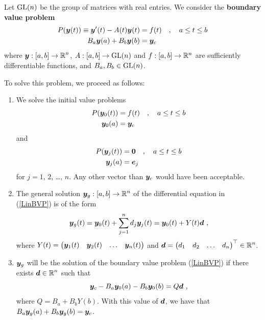 Let $\mathrm{GL}(n)$ be the group of \nn matrices with real entries.
We consider the
{\bfseries boundary value problem}
\begin{equation} \label{LinBVP}
\begin{split}
P(\bm{y}(t)) \equiv \bm{y}'(t) - A(t) \bm{y}(t) &= f(t)
\quad , \quad a \leq t \leq b  \\
B_a\bm{y}(a) + B_b\bm{y}(b) &= \bm{y}_c
\end{split}
\end{equation}
where $\displaystyle \bm{y} : [a,b] \rightarrow \mathbb{R}^n$,
$\displaystyle A:[a,b] \rightarrow \mathrm{GL}(n)$ and $f:[a,b]\rightarrow \mathbb{R}^n$
are sufficiently differentiable functions, and
$B_a, B_b \in \mathrm{GL}(n)$.

To solve this problem, we proceed as follows:

\begin{algo} \label{AlgoSimpleSM}
\begin{enumerate}
\item We solve the initial value problems
\begin{equation} \label{partS}
\begin{split}
P(\bm{y}_0(t)) &= f(t) \quad , \quad a \leq t \leq b \\
\bm{y}_0(a) &= \bm{y}_c
\end{split}
\end{equation}
and
\begin{equation} \label{genS}
\begin{split}
P(\bm{y}_j(t)) &= \bm{0} \quad , \quad a \leq t \leq b \\
\bm{y}_j(a) &= \bm{e}_j
\end{split}
\end{equation}
for $j=1$, $2$, \ldots, $n$.  Any other vector than $\bm{y}_c$ would
have been acceptable.
\item The general solution $\displaystyle \bm{y}_g:[a,b]\to \mathbb{R}^n$ of the
differential equation in (\ref{LinBVP}) is of the form
\[
\bm{y}_g(t) = \bm{y}_0(t) + \sum_{j=1}^n d_j \bm{y}_j(t) =
\bm{y}_0(t) + Y(t) \bm{d} \ ,
\]
where
$\displaystyle Y(t) = \begin{pmatrix}
\bm{y}_1(t) & \bm{y}_2(t) & \ldots & \bm{y}_n(t) \end{pmatrix}$
and $\displaystyle \bm{d} =
\begin{pmatrix} d_1 & d_2 & \ldots & d_n \end{pmatrix}^\top \in \mathbb{R}^n$.
\item $\bm{y}_g$ will be the solution of the boundary value
problem (\ref{LinBVP}) if there exists $\displaystyle \bm{d} \in \mathbb{R}^n$
such that
\begin{equation} \label{BVcond}
\bm{y}_c - B_a\bm{y}_0(a) - B_b\bm{y}_0(b) = Q\bm{d} \ ,
\end{equation}
where $Q = B_a + B_b Y(b)$.  With this value of $\bm{d}$, we have
that $B_a\bm{y}_g(a) + B_b\bm{y}_g(b) = \bm{y}_c$.  \label{ShootStep3}
\end{enumerate}
\end{algo}


